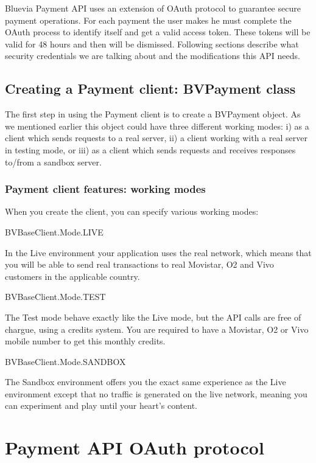 Bluevia Payment API uses an extension of OAuth protocol to guarantee secure payment operations. For each payment the user makes he must complete the OAuth process to identify itself and get a valid access token. These tokens will be valid for 48 hours and then will be dismissed. Following sections describe what security credentials we are talking about and the modifications this API needs.\hypertarget{blv_payment_guide_creating_a_payment_client_sec}{}\subsection{Creating a Payment client: BVPayment class}\label{blv_payment_guide_creating_a_payment_client_sec}
The first step in using the Payment client is to create a BVPayment object. As we mentioned earlier this object could have three different working modes: i) as a client which sends requests to a real server, ii) a client working with a real server in testing mode, or iii) as a client which sends requests and receives responses to/from a sandbox server.\hypertarget{blv_payment_guide_paymentclient_features_working_modes_sec}{}\subsubsection{Payment client features: working modes}\label{blv_payment_guide_paymentclient_features_working_modes_sec}
When you create the client, you can specify various working modes: 
\begin{DoxyItemize}
\item BVBaseClient.Mode.LIVE \par
In the Live environment your application uses the real network, which means that you will be able to send real transactions to real Movistar, O2 and Vivo customers in the applicable country.


\item BVBaseClient.Mode.TEST \par
The Test mode behave exactly like the Live mode, but the API calls are free of chargue, using a credits system. You are required to have a Movistar, O2 or Vivo mobile number to get this monthly credits.


\item BVBaseClient.Mode.SANDBOX \par
The Sandbox environment offers you the exact same experience as the Live environment except that no traffic is generated on the live network, meaning you can experiment and play until your heart’s content. 
\end{DoxyItemize}\hypertarget{blv_payment_guide_paymentclient_features_security_credentials_sec}{}\section{Payment API OAuth protocol}\label{blv_payment_guide_paymentclient_features_security_credentials_sec}

